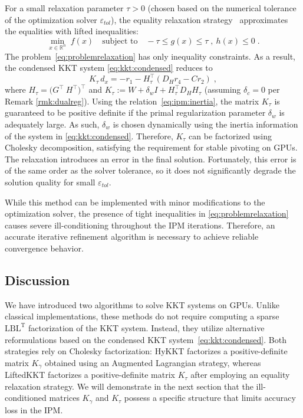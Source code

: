 \documentclass[smallextended]{svjour3}
\newcommand{\lblt}{$\mathrm{LBL^T}$\xspace}
\begin{document}
For a small relaxation parameter $\tau > 0$ (chosen based on the numerical tolerance of the optimization solver $\varepsilon_{tol}$), the equality relaxation strategy~\cite{shin2023accelerating} approximates the equalities with lifted inequalities:
\begin{equation}
  \label{eq:problemrelaxation}
    \min_{x \in \mathbb{R}^n} \;  f(x)
\quad \text{subject to}\quad
     - \tau \leq g(x) \leq \tau \;,~  h(x) \leq 0  \; .
\end{equation}
The problem~\eqref{eq:problemrelaxation} has only inequality constraints. As
a result, the condensed KKT system \eqref{eq:kkt:condensed} reduces to
\begin{equation}
  \label{eq:liftedkkt}
    K_\tau \,d_x = - r_1 - H_\tau^\top(D_H r_4 - C r_2) \; ,
\end{equation}
where $H_\tau = \big(G^\top ~ H^\top\big)^\top$ and
$K_\tau := W + \delta_w I + H_\tau^\top D_H H_\tau$ (assuming $\delta_c=0$ per Remark \ref{rmk:dualreg}). Using the relation~\eqref{eq:ipm:inertia}, the matrix $K_\tau$
is guaranteed to be positive definite if the primal regularization parameter
$\delta_w$ is adequately large. As such, $\delta_w$ is chosen dynamically
using the inertia information of the system in \eqref{eq:kkt:condensed}.
Therefore, $K_\tau$ can be factorized using Cholesky decomposition,
satisfying the requirement for stable pivoting on GPUs.
The relaxation introduces an error in the final solution. Fortunately,
this error is of the same order as the solver tolerance, so it does not
significantly degrade the solution quality for small $\varepsilon_{tol}$.

While this method can be implemented with minor modifications to the
optimization solver, the presence of tight inequalities in
\eqref{eq:problemrelaxation} causes severe ill-conditioning throughout the
IPM iterations. Therefore, an accurate iterative refinement algorithm
is necessary to achieve reliable convergence behavior.


\subsection{Discussion}
We have introduced two algorithms to solve KKT systems on GPUs.
Unlike classical implementations, these methods do not require computing a
sparse \lblt factorization of the KKT system. Instead, they utilize alternative
reformulations based on the condensed KKT system~\eqref{eq:kkt:condensed}.
Both strategies rely on Cholesky factorization: HyKKT factorizes a
positive-definite matrix $K_\gamma$ obtained using an Augmented Lagrangian strategy,
whereas LiftedKKT factorizes a positive-definite matrix $K_\tau$ after employing an equality relaxation strategy.
We will demonstrate in the next section that the ill-conditioned matrices
$K_\gamma$ and $K_\tau$ possess a specific structure that limits accuracy loss in the IPM.
\end{document}
